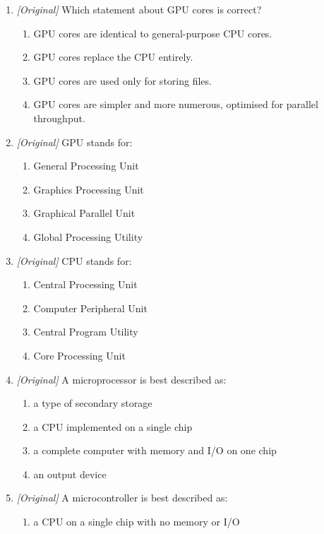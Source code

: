\documentclass[11pt]{article}
\begin{document}
\begin{enumerate}[label=\textbf{Q\arabic*.}, leftmargin=*]
\begin{enumerate}[label=\Alph*.]
    \item a GPU is always required
  \end{enumerate}
\item \textit{[Original]} Which statement about GPU cores is correct?
  \begin{enumerate}[label=\Alph*.]
    \item GPU cores are identical to general-purpose CPU cores.
    \item GPU cores replace the CPU entirely.
    \item GPU cores are used only for storing files.
    \item GPU cores are simpler and more numerous, optimised for parallel
      throughput.
  \end{enumerate}
\item \textit{[Original]} GPU stands for:
  \begin{enumerate}[label=\Alph*.]
    \item General Processing Unit
    \item Graphics Processing Unit
    \item Graphical Parallel Unit
    \item Global Processing Utility
  \end{enumerate}
\item \textit{[Original]} CPU stands for:
  \begin{enumerate}[label=\Alph*.]
    \item Central Processing Unit
    \item Computer Peripheral Unit
    \item Central Program Utility
    \item Core Processing Unit
  \end{enumerate}
\item \textit{[Original]} A microprocessor is best described as:
  \begin{enumerate}[label=\Alph*.]
    \item a type of secondary storage
    \item a CPU implemented on a single chip
    \item a complete computer with memory and I/O on one chip
    \item an output device
  \end{enumerate}
\item \textit{[Original]} A microcontroller is best described as:
  \begin{enumerate}[label=\Alph*.]
    \item a CPU on a single chip with no memory or I/O

\end{enumerate}
\end{enumerate}
\end{document}

